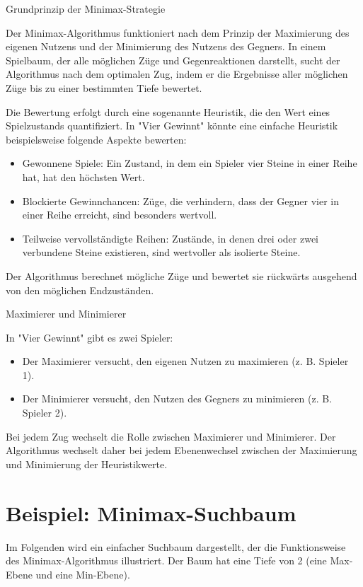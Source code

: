 Grundprinzip der Minimax-Strategie

Der Minimax-Algorithmus funktioniert nach dem Prinzip der Maximierung des eigenen Nutzens und der Minimierung des Nutzens des Gegners. In einem Spielbaum, der alle möglichen Züge und Gegenreaktionen darstellt, sucht der Algorithmus nach dem optimalen Zug, indem er die Ergebnisse aller möglichen Züge bis zu einer bestimmten Tiefe bewertet.

Die Bewertung erfolgt durch eine sogenannte Heuristik, die den Wert eines Spielzustands quantifiziert. In "Vier Gewinnt" könnte eine einfache Heuristik beispielsweise folgende Aspekte bewerten:

\begin{itemize}
	\item Gewonnene Spiele: Ein Zustand, in dem ein Spieler vier Steine in einer Reihe hat, hat den höchsten Wert.
	\item Blockierte Gewinnchancen: Züge, die verhindern, dass der Gegner vier in einer Reihe erreicht, sind besonders wertvoll.
	\item Teilweise vervollständigte Reihen: Zustände, in denen drei oder zwei verbundene Steine existieren, sind wertvoller als isolierte Steine.
\end{itemize}

Der Algorithmus berechnet mögliche Züge und bewertet sie rückwärts ausgehend von den möglichen Endzuständen.

Maximierer und Minimierer

In "Vier Gewinnt" gibt es zwei Spieler:

\begin{itemize}
	\item Der Maximierer versucht, den eigenen Nutzen zu maximieren (z. B. Spieler 1).
	\item Der Minimierer versucht, den Nutzen des Gegners zu minimieren (z. B. Spieler 2).
\end{itemize}

Bei jedem Zug wechselt die Rolle zwischen Maximierer und Minimierer. Der Algorithmus wechselt daher bei jedem Ebenenwechsel zwischen der Maximierung und Minimierung der Heuristikwerte.

\section*{Beispiel: Minimax-Suchbaum}

Im Folgenden wird ein einfacher Suchbaum dargestellt, der die Funktionsweise des Minimax-Algorithmus illustriert. Der Baum hat eine Tiefe von 2 (eine Max-Ebene und eine Min-Ebene).

